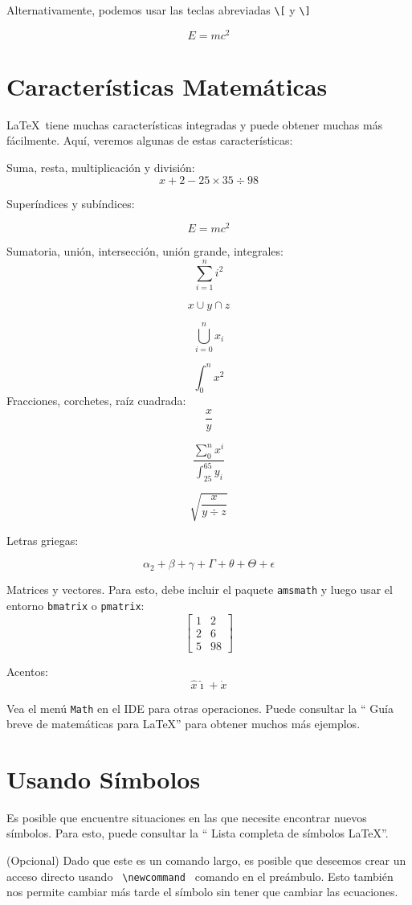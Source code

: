 \documentclass{article}
\begin{document}
	Alternativamente, podemos usar las teclas abreviadas \verb|\[| y \verb|\]|
	
	\[
	E=mc^2
	\]
	
	\section{Características Matemáticas}
	\LaTeX\ tiene muchas características integradas y puede obtener muchas más fácilmente. Aquí, veremos algunas de estas características:
	
	Suma, resta, multiplicación y división:
	\[
	x + 2 - 25 \times 35 \div 98
	\]
	
	Superíndices y subíndices:
	
	\[
	E = mc^2
	\]
	
	Sumatoria, unión, intersección, unión grande, integrales:
	\[
	\sum_{i=1}^{n} i^2
	\]	
	
	\[
	x \cup y \cap z 
	\]
	
	\[
	\bigcup_{i=0}^n x_i  
	\]
	
	\[
	\int_{0}^{n} x^2
	\]
	Fracciones, corchetes, raíz cuadrada:
	\[
	\frac{x}{y}
	\]
	
	\[
			\frac{
				\sum_0^n x^i
			}{
				\int_{25}^{65} y_i
			}
	\]
	
	\[
	\sqrt{
		\frac{x}{
			y \div z
		}
	}
	\]
	
	Letras griegas:
	
	\[
	\alpha_2 + \beta + \gamma + \Gamma + \theta + \Theta + \epsilon
	\]
	
	
	Matrices y vectores. Para esto, debe incluir el paquete \texttt {amsmath} y luego usar el entorno \texttt {bmatrix} o \texttt {pmatrix}:
	\[
	\begin{bmatrix}
		1   &   2 \\
		2  &  6 \\
		5  &  98
	\end{bmatrix}
	\]
	
	Acentos:
	\[
	\hat{x} \hat {\imath} + \dot{x}
	\]
	
	
	Vea el menú \texttt {Math} en el IDE para otras operaciones. Puede consultar la `` Guía breve de matemáticas para \LaTeX '' para obtener muchos más ejemplos. 
	
	\section{Usando Símbolos} 
	Es posible que encuentre situaciones en las que necesite encontrar nuevos símbolos. Para esto, puede consultar la `` Lista completa de símbolos \LaTeX ''.
	
	
	
	
	
	(Opcional) Dado que este es un comando largo, es posible que deseemos crear un acceso directo usando \verb| \newcommand | comando en el preámbulo. Esto también nos permite cambiar más tarde el símbolo sin tener que cambiar las ecuaciones.
	
	
\end{document}
